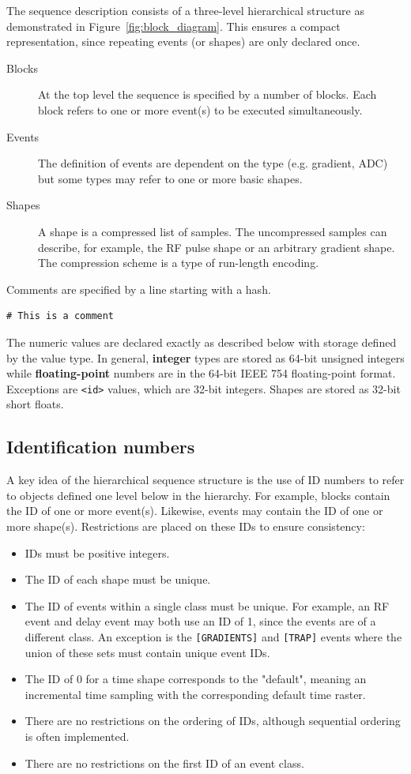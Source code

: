 \documentclass{article}
\begin{document}
The sequence description consists of a three-level hierarchical structure as demonstrated in Figure~\ref{fig:block_diagram}. This ensures a compact representation, since repeating events (or shapes) are only declared once.
\begin{description}
\item[Blocks] At the top level the sequence is specified by a number of blocks. Each block refers to one or more event(s) to be executed simultaneously.
\item[Events] The definition of events are dependent on the type (e.g. gradient, ADC) but some types may refer to one or more basic shapes.
\item[Shapes] A shape is a compressed list of samples. The uncompressed samples can describe, for example, the RF pulse shape or an arbitrary gradient shape. The compression scheme is a type of run-length encoding.
\end{description}

Comments are specified by a line starting with a hash.
\begin{lstlisting}
# This is a comment
\end{lstlisting}

The numeric values are declared exactly as described below with storage defined by the value type. In general, \textbf{integer} types are stored as 64-bit unsigned integers while \textbf{floating-point} numbers are in the 64-bit IEEE 754 floating-point format. Exceptions are \verb.<id>. values, which are 32-bit integers. Shapes are stored as 32-bit short floats.

\subsection{Identification numbers}
A key idea of the hierarchical sequence structure is the use of ID numbers to refer to objects defined one level below in the hierarchy. For example, blocks contain the ID of one or more event(s). Likewise, events may contain the ID of one or more shape(s). Restrictions are placed on these IDs to ensure consistency:
\begin{itemize}
\item IDs must be positive integers.
\item The ID of each shape must be unique.
\item The ID of events within a single class must be unique. For example, an RF event and delay event may both use an ID of 1, since the events are of a different class. An exception is the \verb.[GRADIENTS]. and \verb.[TRAP]. events where the union of these sets must contain unique event IDs.
\item The ID of 0 for a time shape corresponds to the "default", meaning an incremental time sampling with the corresponding default time raster.
\item There are no restrictions on the ordering of IDs, although sequential ordering is often implemented.
\item There are no restrictions on the first ID of an event class.
\end{itemize}
\end{document}

